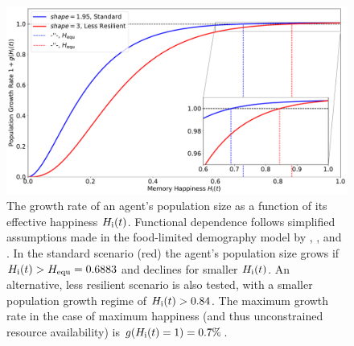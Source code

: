 \begin{figure}
	\centering
	\includegraphics[width=\textwidth]{images/populationchange_g}
	\caption{The growth rate of an agent's population size as a function of its effective happiness $H_{\rm i}(t)$. Functional dependence follows simplified assumptions made in the food-limited demography model by \citet{Lee2008}, \citet{Puleston2008}, and \citet{Puleston2017}. In the standard scenario (red) the agent's population size grows if $H_{\rm i}(t)>H_{\rm equ}=0.6883$ and declines for smaller $H_{\rm i}(t)$. An alternative, less resilient scenario is also tested, with a smaller population growth regime of $H_{\rm i}(t)>0.84$. The maximum growth rate in the case of maximum happiness (and thus unconstrained resource availability) is $g(H_{\rm i}(t)=1)=0.7\%$.}
	\label{fig:growthrate}
\end{figure}

